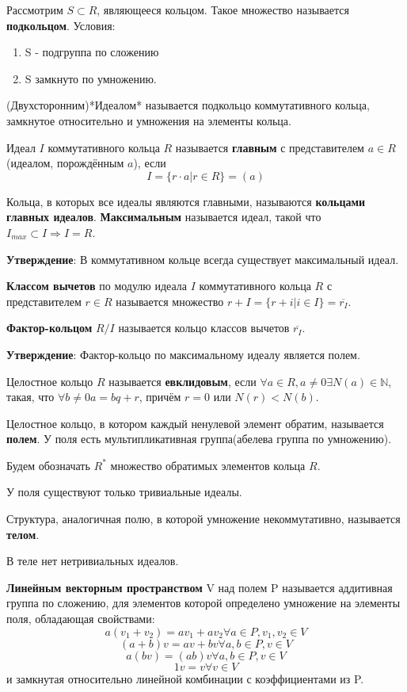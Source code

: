 \documentclass[11pt]{article}
\newcounter{th}\setcounter{th}{0}
\def\th{\par\smallskip\refstepcounter{th}\textbf{\arabic{th}}}
\newtheorem*{Theorem}{Теорема \th}
\begin{document}
Рассмотрим \(S \subset R\), являющееся кольцом. Такое множество называется \textbf{подкольцом}. Условия:
\begin{enumerate}
\item S - подгруппа по сложению
\item S замкнуто по умножению.
\end{enumerate}

(Двухсторонним)*Идеалом* называется подкольцо коммутативного кольца, замкнутое относительно
и умножения на элементы кольца.

Идеал \(I\) коммутативного кольца \(R\) называется \textbf{главным} с представителем \(a \in R\)(идеалом, порождённым \(a\)), если
$$I = \{r\cdot a | r \in R\} = (a)$$

Кольца, в которых все идеалы являются главными, называются \textbf{кольцами главных идеалов}. \textbf{Максимальным}
называется идеал, такой что \(I_{max} \subset I \Rightarrow I = R\).

\textbf{Утверждение}: В коммутативном кольце всегда существует максимальный идеал.

\textbf{Классом вычетов} по модулю идеала \(I\) коммутативного кольца \(R\) с представителем \(r \in R\)
называется множество \(r + I = \{r + i | i \in I\} = \overline{r_I}\).

\textbf{Фактор-кольцом} \(R/I\) называется кольцо классов вычетов \(\overline{r_I}\).

\textbf{Утверждение}: Фактор-кольцо по максимальному идеалу является полем.

Целостное кольцо \(R\) называется \textbf{евклидовым}, если \(\forall a \in R, a \neq 0 \exists N(a) \in \mathbb{N}\),
такая, что \(\forall b \neq 0 a = bq + r\), причём \(r = 0\) или \(N(r) < N(b)\).

Целостное кольцо, в котором каждый ненулевой элемент обратим, называется \textbf{полем}. У поля есть
мультипликативная группа(абелева группа по умножению).

Будем обозначать \(R^*\) множество обратимых элементов кольца \(R\).

У поля существуют только тривиальные идеалы.

Структура, аналогичная полю, в которой умножение некоммутативно, называется \textbf{телом}.
\begin{Theorem}
В теле нет нетривиальных идеалов.
\end{Theorem}
\textbf{Линейным векторным пространством} V над полем P называется аддитивная группа по сложению,
для элементов которой определено умножение на элементы поля, обладающая свойствами:
$$a(v_1 + v_2) = av_1 + av_2 \forall a \in P, v_1, v_2 \in V$$
$$(a + b)v = av + bv \forall a, b \in P, v \in V$$
$$a(bv) = (ab)v \forall a, b \in P, v \in V$$
$$1v = v \forall v \in V$$
и замкнутая относительно линейной комбинации с коэффициентами из P.
\end{document}
